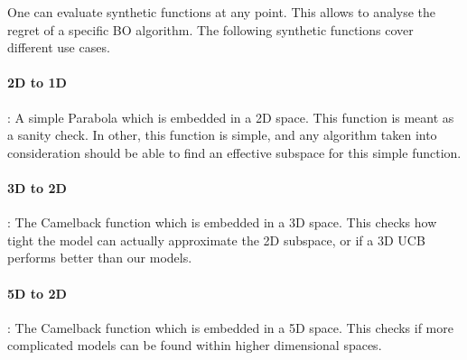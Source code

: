 One can evaluate synthetic functions at any point.
This allows to analyse the regret of a specific BO algorithm.
The following synthetic functions cover different use cases.

\paragraph{2D to 1D}: A simple Parabola which is embedded in a 2D space.
This function is meant as a sanity check.
In other, this function is simple, and any algorithm taken into consideration should be able to find an effective subspace for this simple function.
\paragraph{3D to 2D}: The Camelback function which is embedded in a 3D space.
This checks how tight the model can actually approximate the 2D subspace, or if a 3D UCB performs better than our models.
\paragraph{5D to 2D}: The Camelback function which is embedded in a 5D space.
This checks if more complicated models can be found within higher dimensional spaces.

